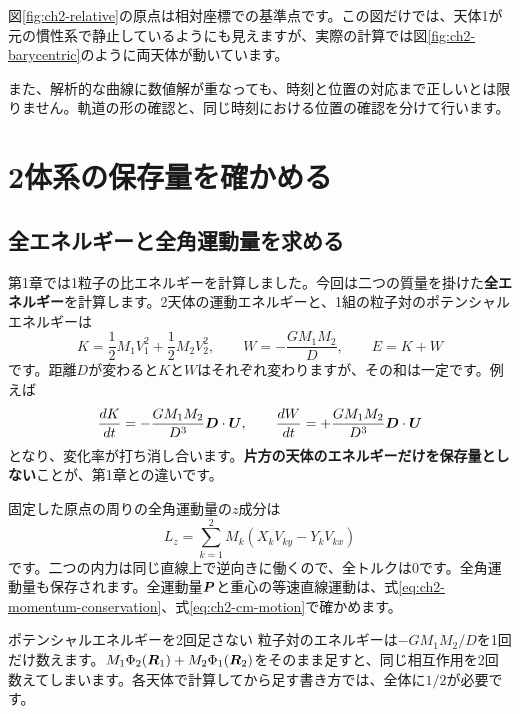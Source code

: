 図\ref{fig:ch2-relative}の原点は相対座標での基準点です。この図だけでは、天体1が元の慣性系で静止しているようにも見えますが、実際の計算では図\ref{fig:ch2-barycentric}のように両天体が動いています。

また、解析的な曲線に数値解が重なっても、時刻と位置の対応まで正しいとは限りません。軌道の形の確認と、同じ時刻における位置の確認を分けて行います。

\section{2体系の保存量を確かめる}
\label{sec:ch2-conservation}
\subsection{全エネルギーと全角運動量を求める}
第1章では1粒子の比エネルギーを計算しました。今回は二つの質量を掛けた\textbf{全エネルギー}を計算します。2天体の運動エネルギーと、1組の粒子対のポテンシャルエネルギーは
\begin{equation}
K=\frac12M_1V_1^2+\frac12M_2V_2^2,\qquad
W=-\frac{GM_1M_2}{D},\qquad E=K+W
\label{eq:ch2-total-energy}
\end{equation}
です。距離$D$が変わると$K$と$W$はそれぞれ変わりますが、その和は一定です。例えば
\begin{equation}
\frac{dK}{dt}=-\frac{GM_1M_2}{D^3}\boldsymbol D\cdot\boldsymbol U,\qquad
\frac{dW}{dt}=+\frac{GM_1M_2}{D^3}\boldsymbol D\cdot\boldsymbol U
\label{eq:ch2-energy-balance}
\end{equation}
となり、変化率が打ち消し合います。\textbf{片方の天体のエネルギーだけを保存量としない}ことが、第1章との違いです。

固定した原点の周りの全角運動量の$z$成分は
\begin{equation}
L_z=\sum_{k=1}^{2}M_k(X_kV_{ky}-Y_kV_{kx})
\label{eq:ch2-total-angular}
\end{equation}
です。二つの内力は同じ直線上で逆向きに働くので、全トルクは0です。全角運動量も保存されます。全運動量$\boldsymbol P$と重心の等速直線運動は、式\eqref{eq:ch2-momentum-conservation}、式\eqref{eq:ch2-cm-motion}で確かめます。

\begin{failbox}{ポテンシャルエネルギーを2回足さない}
粒子対のエネルギーは$-GM_1M_2/D$を1回だけ数えます。$M_1\Phi_2(\boldsymbol R_1)+M_2\Phi_1(\boldsymbol R_2)$をそのまま足すと、同じ相互作用を2回数えてしまいます。各天体で計算してから足す書き方では、全体に$1/2$が必要です。
\end{failbox}

